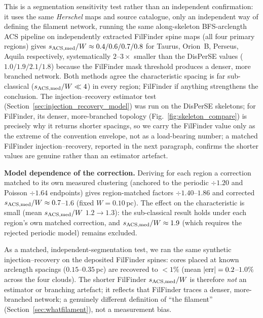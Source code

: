 \documentclass[usenatbib,twoside,twocolumn]{mnras}
\begin{document}
This is a segmentation sensitivity test rather than an independent confirmation: it uses the same \textit{Herschel} maps and source catalogue, only an independent way of defining the filament network, running the same along-skeleton BFS-arclength ACS pipeline on independently extracted FilFinder spine maps (all four primary regions) gives $s_{\rm ACS,med}/W\approx0.4/0.6/0.7/0.8$ for Taurus, Orion~B, Perseus, Aquila respectively, systematically $2$--$3\times$ smaller than the DisPerSE values ($1.0/1.9/2.1/1.8$) because the FilFinder mask threshold produces a denser, more branched network. Both methods agree the characteristic spacing is far sub-classical ($s_{\rm ACS,med}/W\ll4$) in every region; FilFinder if anything strengthens the conclusion. The injection--recovery estimator test (Section~\ref{sec:injection_recovery_model}) was run on the DisPerSE skeletons; for FilFinder, its denser, more-branched topology (Fig.~\ref{fig:skeleton_compare}) is precisely why it returns shorter spacings, so we carry the FilFinder value only as the extreme of the convention envelope, not as a load-bearing number; a matched FilFinder injection--recovery, reported in the next paragraph, confirms the shorter values are genuine rather than an estimator artefact.

\smallskip\noindent\textbf{Model dependence of the correction.}\label{sec:injection_recovery_model}
Deriving for each region a correction matched to its own measured clustering (anchored to the periodic $\div1.20$ and Poisson $\div1.64$ endpoints) gives region-matched factors $\div1.40$--$1.86$ and corrected $s_{\rm ACS,med}/W\approx0.7$--$1.6$ (fixed $W=0.10$\,pc). The effect on the characteristic is small (mean $s_{\rm ACS,med}/W$ $1.2\to1.3$): the sub-classical result holds under each region's own matched correction, and $s_{\rm ACS,med}/W\approx1.9$ (which requires the rejected periodic model) remains excluded.

As a matched, independent-segmentation test, we ran the same synthetic injection--recovery on the deposited FilFinder spines: cores placed at known arclength spacings ($0.15$--$0.35$\,pc) are recovered to $<1\%$ (mean $|{\rm err}|=0.2$--$1.0\%$ across the four clouds). The shorter FilFinder $s_{\rm ACS,med}/W$ is therefore \emph{not} an estimator or branching artefact; it reflects that FilFinder traces a denser, more-branched network; a genuinely different definition of ``the filament'' (Section~\ref{sec:whatfilament}), not a measurement bias.
\end{document}
